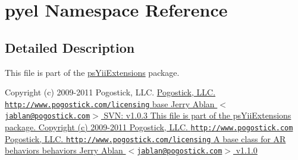 \hypertarget{namespacepyel}{
\section{pyel Namespace Reference}
\label{namespacepyel}
}


\subsection{Detailed Description}
This file is part of the \hyperlink{namespacepsYiiExtensions}{psYiiExtensions} package.

Copyright (c) 2009-\/2011 Pogostick, LLC. \hyperlink{}{Pogostick, LLC.  \href{http://www.pogostick.com/licensing}{\tt http://www.pogostick.com/licensing}    base   Jerry Ablan $<$\href{mailto:jablan@pogostick.com}{\tt jablan@pogostick.com}$>$  SVN:   v1.0.3  This file is part of the psYiiExtensions package.   Copyright (c) 2009-\/2011 Pogostick, LLC.  \href{http://www.pogostick.com}{\tt http://www.pogostick.com} Pogostick, LLC.  \href{http://www.pogostick.com/licensing}{\tt http://www.pogostick.com/licensing}  A base class for AR behaviors   behaviors   Jerry Ablan $<$\href{mailto:jablan@pogostick.com}{\tt jablan@pogostick.com}$>$  v1.1.0 }